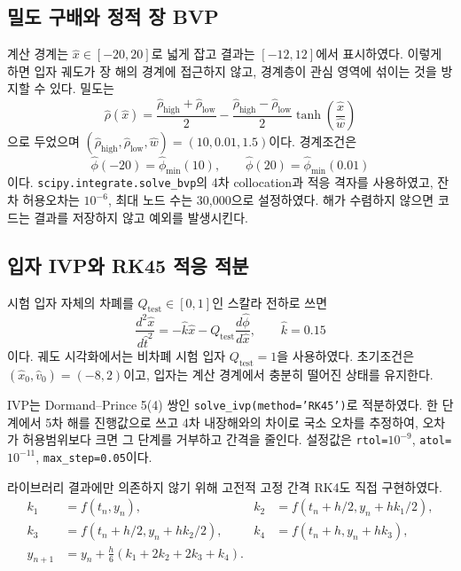 \documentclass[11pt, a4paper]{article}
\begin{document}
\subsection{밀도 구배와 정적 장 BVP}
계산 경계는 $\hat{x}\in[-20,20]$로 넓게 잡고 결과는 $[-12,12]$에서 표시하였다. 이렇게 하면 입자 궤도가 장 해의 경계에 접근하지 않고, 경계층이 관심 영역에 섞이는 것을 방지할 수 있다. 밀도는
\begin{equation}
 \hat{\rho}(\hat{x})=\frac{\hat{\rho}_{\mathrm{high}}+\hat{\rho}_{\mathrm{low}}}{2}
 -\frac{\hat{\rho}_{\mathrm{high}}-\hat{\rho}_{\mathrm{low}}}{2}
 \tanh\!\left(\frac{\hat{x}}{\hat{w}}\right)
\end{equation}
으로 두었으며 $(\hat{\rho}_{\mathrm{high}},\hat{\rho}_{\mathrm{low}},\hat{w})=(10,0.01,1.5)$이다. 경계조건은
\begin{equation}
 \hat{\phi}(-20)=\hat{\phi}_{\min}(10),\qquad
 \hat{\phi}(20)=\hat{\phi}_{\min}(0.01)
\end{equation}
이다. \texttt{scipy.integrate.solve\_bvp}의 4차 collocation과 적응 격자를 사용하였고, 잔차 허용오차는 $10^{-6}$, 최대 노드 수는 30,000으로 설정하였다. 해가 수렴하지 않으면 코드는 결과를 저장하지 않고 예외를 발생시킨다.

\subsection{입자 IVP와 RK45 적응 적분}
시험 입자 자체의 차폐를 $Q_{\mathrm{test}}\in[0,1]$인 스칼라 전하로 쓰면
\begin{equation}
 \frac{d^2\hat{x}}{d\hat{t}^2}=-\hat{k}\hat{x}
 -Q_{\mathrm{test}}\frac{d\hat{\phi}}{d\hat{x}},\qquad \hat{k}=0.15
\end{equation}
이다. 궤도 시각화에서는 비차폐 시험 입자 $Q_{\mathrm{test}}=1$을 사용하였다. 초기조건은 $(\hat{x}_0,\hat{v}_0)=(-8,2)$이고, 입자는 계산 경계에서 충분히 떨어진 상태를 유지한다.

IVP는 Dormand--Prince 5(4) 쌍인 \texttt{solve\_ivp(method='RK45')}로 적분하였다. 한 단계에서 5차 해를 진행값으로 쓰고 4차 내장해와의 차이로 국소 오차를 추정하여, 오차가 허용범위보다 크면 그 단계를 거부하고 간격을 줄인다. 설정값은 \texttt{rtol=$10^{-9}$}, \texttt{atol=$10^{-11}$}, \texttt{max\_step=0.05}이다.

라이브러리 결과에만 의존하지 않기 위해 고전적 고정 간격 RK4도 직접 구현하였다.
\begin{align}
 k_1&=f(t_n,y_n),& k_2&=f(t_n+h/2,y_n+hk_1/2),\\
 k_3&=f(t_n+h/2,y_n+hk_2/2),& k_4&=f(t_n+h,y_n+hk_3),\\
 y_{n+1}&=y_n+\frac{h}{6}(k_1+2k_2+2k_3+k_4).&&
\end{align}
\end{document}
